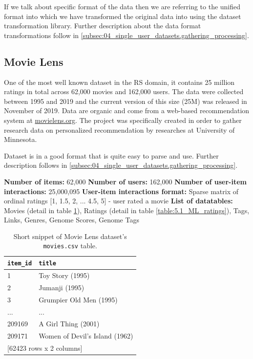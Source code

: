 If we talk about specific format of the data then we are referring to the unified format into which we have transformed the original data into using the dataset transformation library. Further description about the data format transformations follow in \ref{subsec:04_single_user_datasets.gathering_processing}.



\subsection{Movie Lens}
One of the most well known dataset in the RS domain, it contains 25 million ratings in total across 62,000 movies and 162,000 users. The data were collected between 1995 and 2019 and the current version of this size (25M) was released in November of 2019. Data are organic and come from a web-based recommendation system at \href{https://movielens.org/}{movielens.org}. The project was specifically created in order to gather research data on personalized recommendation by researches at University of Minnesota.

Dataset is in a good format that is quite easy to parse and use. Further description follows in \ref{subsec:04_single_user_datasets.gathering_processing}.

\hfill \break
\noindent
\textbf{Number of items:} 62,000 \newline
\textbf{Number of users:} 162,000 \newline
\textbf{Number of user-item interactions:} 25,000,095 \newline
\textbf{User-item interactions format:} Sparse matrix of ordinal ratings [1, 1.5, 2, ... 4.5, 5] - user rated a movie \newline
\textbf{List of datatables:} Movies (detail in table \ref{table:5.1_ML_movies}), Ratings (detail in table \ref{table:5.1_ML_ratings}), Tags, Links, Genres, Genome Scores, Genome Tags

\begin{table}[!ht]
\centering
\begin{tabular}{ l l }
\verb|item_id| & \verb|title| \\
    \hline
     1  &                   Toy Story (1995) \\
     2  &                     Jumanji (1995) \\
     3  &            Grumpier Old Men (1995) \\
   ...  &                                ... \\
209169  &                A Girl Thing (2001) \\
209171  &     Women of Devil's Island (1962) \\ [1mm]
\multicolumn{2}{l}{{[62423 rows x 2 columns]}}
\end{tabular}
\caption{Short snippet of Movie Lens dataset's \texttt{movies.csv} table.}
\label{table:5.1_ML_movies}
\end{table}

